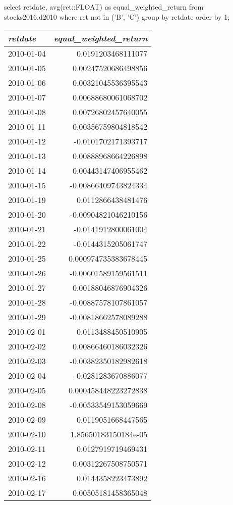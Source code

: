 select retdate, avg(ret::FLOAT) as equal_weighted_return
from stocks2016.d2010
where ret not in ('B', 'C')
group by retdate
order by 1;
\begin{tabular}{l | r}
\textit{retdate} & \textit{equal\_weighted\_return} \\
\hline
2010-01-04 & 0.0191203468111077 \\
2010-01-05 & 0.00247520686498856 \\
2010-01-06 & 0.00321045536395543 \\
2010-01-07 & 0.00688680061068702 \\
2010-01-08 & 0.00726802457640055 \\
2010-01-11 & 0.00356759804818542 \\
2010-01-12 & -0.0101702171393717 \\
2010-01-13 & 0.00888968664226898 \\
2010-01-14 & 0.00443147406955462 \\
2010-01-15 & -0.00866409743824334 \\
2010-01-19 & 0.0112866438481476 \\
2010-01-20 & -0.00904821046210156 \\
2010-01-21 & -0.0141912800061004 \\
2010-01-22 & -0.0144315205061747 \\
2010-01-25 & 0.000974735383678445 \\
2010-01-26 & -0.00601589159561511 \\
2010-01-27 & 0.00188046876904326 \\
2010-01-28 & -0.00887578107861057 \\
2010-01-29 & -0.00818662578089288 \\
2010-02-01 & 0.0113488450510905 \\
2010-02-02 & 0.00866460186032326 \\
2010-02-03 & -0.00382350182982618 \\
2010-02-04 & -0.0281283670886077 \\
2010-02-05 & 0.000458448223272838 \\
2010-02-08 & -0.00533549153059669 \\
2010-02-09 & 0.0119051668447565 \\
2010-02-10 & 1.85650183150184e-05 \\
2010-02-11 & 0.0127919719469431 \\
2010-02-12 & 0.00312267508750571 \\
2010-02-16 & 0.0144358223473892 \\
2010-02-17 & 0.00505181458365048 \\

\end{tabular}
